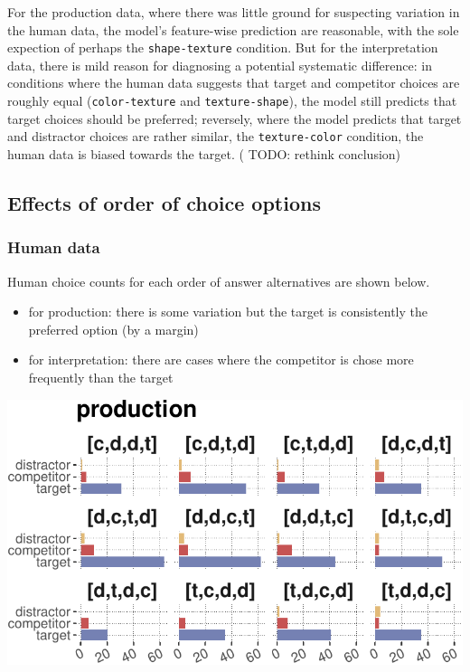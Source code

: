 \documentclass{article}
\begin{document}
For the production data, where there was little ground for suspecting
variation in the human data, the model's feature-wise prediction are
reasonable, with the sole expection of perhaps the
\texttt{shape-texture} condition. But for the interpretation data, there
is mild reason for diagnosing a potential systematic difference: in
conditions where the human data suggests that target and competitor
choices are roughly equal (\texttt{color-texture} and
\texttt{texture-shape}), the model still predicts that target choices
should be preferred; reversely, where the model predicts that target and
distractor choices are rather similar, the \texttt{texture-color}
condition, the human data is biased towards the target. ( {TODO: rethink
conclusion})

\hypertarget{effects-of-order-of-choice-options}{%
\subsection{Effects of order of choice
options}\label{effects-of-order-of-choice-options}}

\hypertarget{human-data-1}{%
\subsubsection{Human data}\label{human-data-1}}

Human choice counts for each order of answer alternatives are shown
below.

\begin{itemize}
\item
  for production: there is some variation but the target is consistently
  the preferred option (by a margin)
\item
  for interpretation: there are cases where the competitor is chose more
  frequently than the target
\end{itemize}

\includegraphics{00-pics/human-data-counts-per-choiceOrder-1.pdf}
\end{document}
